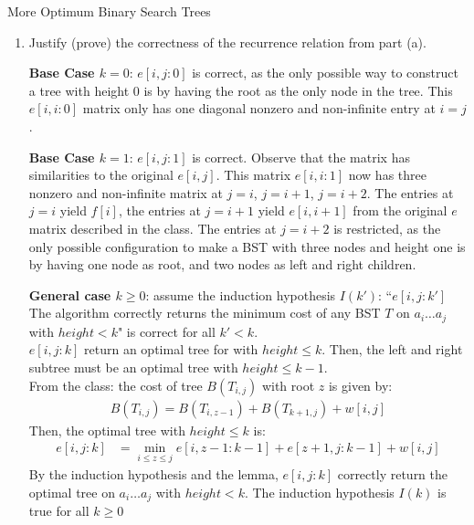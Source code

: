 \documentclass{article}
\numberwithin{table}{section}
\numberwithin{figure}{section}
\begin{document}
\begin{section}{More Optimum Binary Search Trees}
\begin{enumerate}
    \item Justify (prove) the correctness of the recurrence relation from part (a).
    \begin{tcolorbox}[breakable]
        \textbf{Base Case $k=0$}: $e[i,j:0]$ is correct, as the only possible way to construct a tree with height 0 is by having the root as the only node in the tree. This $e[i,i:0]$ matrix only has one diagonal nonzero and non-infinite entry at $i=j$.
        
        \smallskip
        \textbf{Base Case $k=1$}: $e[i,j:1]$ is correct. Observe that the matrix has similarities to the original $e[i,j]$. This matrix $e[i,i:1]$ now has three nonzero and non-infinite matrix at $j=i$, $j=i+1$, $j=i+2$. The entries at $j=i$ yield $f[i]$, the entries at $j=i+1$ yield $e[i, i+1]$ from the original $e$ matrix described in the class. The entries at $j=i+2$ is restricted, as the only possible configuration to make a BST with three nodes and height one is by having one node as root, and two nodes as left and right children. 
        
        \smallskip
        \textbf{General case $k \geq 0$}: assume the induction hypothesis $I(k')$: ``$e[i,j:k']$ The algorithm correctly returns the minimum cost of any BST $T$ on $a_i \dots a_j$ with $height < k$" is correct for all $k' < k$. \\
        $e[i,j:k]$ return an optimal tree for with $height \leq k$. Then, the left and right subtree must be an optimal tree with $height \leq k-1$. \\
        From the class: the cost of tree $B(T_{i,j})$ with root $z$ is given by:
        \begin{align*}
            B(T_{i,j}) = B(T_{i, z-1}) + B(T_{k+1, j}) + w[i,j] 
        \end{align*}
        Then, the optimal tree with $height \leq k$ is:
        \begin{align*}
            e[i,j:k] &= \min_{i \leq z \leq j}{e[i,z-1 :k-1] + e[z+1,j:k-1] + w[i,j]}
        \end{align*}
        By the induction hypothesis and the lemma, $e[i,j: k]$ correctly return the optimal tree on $a_i \dots a_j$ with $height < k$. The induction hypothesis $I(k)$ is true for all $k \geq 0$
    \end{tcolorbox}
    

\end{enumerate}
\end{section}
\end{document}
